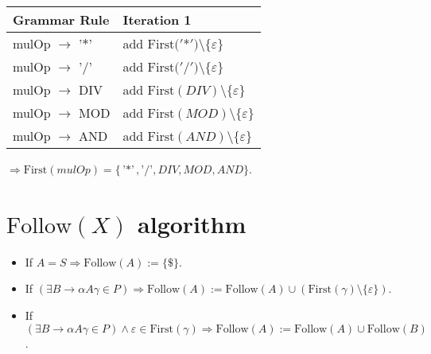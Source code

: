 \documentclass[8pt]{scrartcl}
\newcommand{\First}[1]{\mathrm{First}(#1)}
\newcommand{\Follow}[1]{\mathrm{Follow}(#1)}
\newcommand{\epsset}{\{\varepsilon\}}
\begin{document}
\begin{itemize}
\begin{tabular}{|l |l |}
                    \textbf{Grammar Rule} & \textbf{Iteration 1}\\
                    \hline
                    mulOp $\rightarrow$ '$*$' & add $\First{'$*$'} \setminus \epsset$\\
                    \hline
                    mulOp $\rightarrow$ '$/$' & add $\First{'$/$'} \setminus \epsset$\\
                    \hline
                    mulOp $\rightarrow$ DIV & add $\First{DIV} \setminus \epsset$\\
                    \hline
                    mulOp $\rightarrow$ MOD & add $\First{MOD} \setminus \epsset$\\
                    \hline
                    mulOp $\rightarrow$ AND & add $\First{AND} \setminus \epsset$\\
                    \hline
                \end{tabular}\newline
                $\Rightarrow \First{mulOp} = \{\text{'$*$'}, \text{'$/$'}, DIV, MOD, AND\}$.
        \end{itemize}
    \section{$\Follow{X}$ \textbf{algorithm}}
        \begin{itemize}
            \item If $A = S \Rightarrow \Follow{A} := \{\$\}$.
            \item If $\left(\exists B \rightarrow \alpha A \gamma \in P\right) \Rightarrow \Follow{A} := \Follow{A} \cup \left(\First{\gamma} \setminus \epsset\right)$.
            \item If $\left(\exists B \rightarrow \alpha A \gamma \in P\right) \wedge \varepsilon \in \First{\gamma} \Rightarrow \Follow{A} := \Follow{A} \cup \Follow{B}$.
        \end{itemize}
\end{document}
